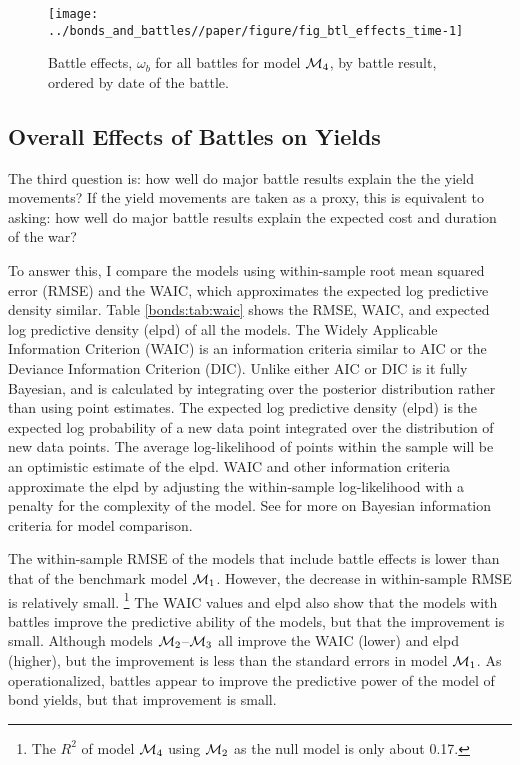 \begin{figure}[!htpb]
  \centering
  \texttt{[image: ../bonds\_and\_battles//paper/figure/fig\_btl\_effects\_time-1]}  
  \caption[Battle effects for model $\Model{3}$, ordered by time]{
    Battle effects, $\omega_{b}$ for all battles for model $\mathcal{M}_{\text{4}}$, by battle result, ordered by date of the battle.
  }
  \label{bonds:fig:btl_effects_time}
\end{figure}



\subsection{Overall Effects of Battles on Yields}
\label{sec:over-effects-battl}

The third question is: how well do major battle results explain the the yield movements? 
If the yield movements are taken as a proxy, this is equivalent to asking: how well do major battle results explain the expected cost and duration of the war? 

To answer this, I compare the models using within-sample root mean squared error (RMSE) and the WAIC, which approximates the expected log predictive density similar.
Table \ref{bonds:tab:waic} shows the RMSE, WAIC, and expected log predictive density (elpd) of all the models.
The Widely Applicable Information Criterion (WAIC) \parencite{Watanabe2010} is an information criteria similar to AIC or the Deviance Information Criterion (DIC).
Unlike either AIC or DIC is it fully Bayesian, and is calculated by integrating over the posterior distribution rather than using point estimates.
The expected log predictive density (elpd) is the expected log probability of a new data point integrated over the distribution of new data points.
The average log-likelihood of points within the sample will be an optimistic estimate of the elpd. 
WAIC and other information criteria approximate the elpd by adjusting the within-sample log-likelihood with a penalty for the complexity of the model.
See \textcites[Ch. 7]{GelmanCarlinSternEtAl2013a}{GelmanHwangVehtari2014a}{GelmanVehtari2014a} for more on Bayesian information criteria for model comparison.

The within-sample RMSE of the models that include battle effects is lower than that of the benchmark model $\mathcal{M}_{\text{1}}$. 
However, the decrease in within-sample RMSE is relatively small.%
\footnote{The $R^{2}$ of model $\mathcal{M}_{\text{4}}$ using $\mathcal{M}_{\text{2}}$ as the null model is only about 0.17.}
The WAIC values and elpd also show that the models with battles improve the predictive ability of the models, but that the improvement is small.
Although models $\mathcal{M}_{\text{2}}$--$\Model{3}$ all improve the WAIC (lower) and elpd (higher), but the improvement is less than the standard errors in model $\mathcal{M}_{\text{1}}$.
As operationalized, battles appear to improve the predictive power of the model of bond yields, but that improvement is small.

